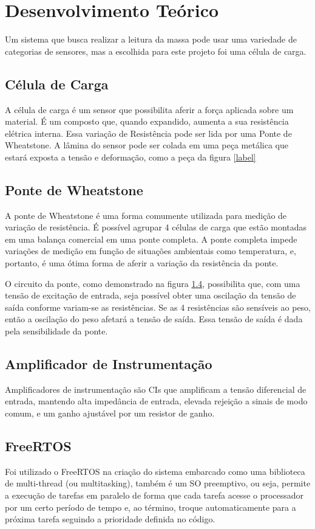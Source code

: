\documentclass[a4paper, 12pt]{article}
\begin{document}
	\section{Desenvolvimento Teórico}
	Um sistema que busca realizar a leitura da massa pode usar uma variedade de categorias de sensores, mas a escolhida para este projeto foi uma célula de carga.
	
	\subsection{Célula de Carga}
	
	A célula de carga é um sensor que possibilita aferir a força aplicada sobre um material. É um composto que, quando expandido, aumenta a sua resistência elétrica interna. Essa variação de Resistência pode ser lida por uma Ponte de Wheatstone. A lâmina do sensor pode ser colada em uma peça metálica que estará exposta a tensão e deformação, como a peça da figura \ref{label}
	
	\subsection{Ponte de Wheatstone}
	
	A ponte de Wheatstone é uma forma comumente utilizada para medição de variação de resistência. É possível agrupar 4 células de carga que estão montadas em uma balança comercial em uma ponte completa. A ponte completa impede variações de medição em função de situações ambientais como temperatura, e, portanto, é uma ótima forma de aferir a variação da resistência da ponte. 
	
	O circuito da ponte, como demonstrado na figura \ref{}, possibilita que, com uma tensão de excitação de entrada, seja possível obter uma oscilação da tensão de saída conforme variam-se as resistências. Se as 4 resistências são sensíveis ao peso, então a oscilação do peso afetará a tensão de saída. Essa tensão de saída é dada pela sensibilidade da ponte.
	
	\subsection{Amplificador de Instrumentação}
	Amplificadores de instrumentação são CIs que amplificam a tensão diferencial de entrada, mantendo alta impedância de entrada, elevada rejeição a sinais de modo comum, e um ganho ajustável por um resistor de ganho. 
	
	\subsection{FreeRTOS}
	Foi utilizado o FreeRTOS na criação do sistema embarcado como uma biblioteca de multi-thread (ou multitasking), também é um SO preemptivo, ou seja, permite a execução de tarefas em paralelo de forma que cada tarefa acesse o processador por um certo período de tempo e, ao término, troque automaticamente para a próxima tarefa seguindo a prioridade definida no código. 
	
\end{document}
